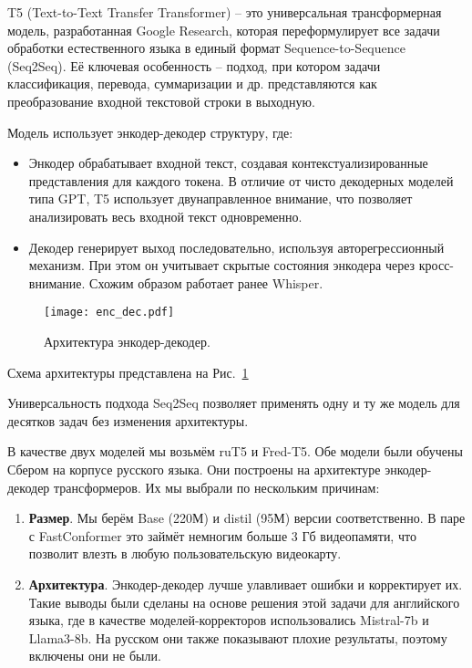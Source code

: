 T5 (Text-to-Text Transfer Transformer) -- это универсальная трансформерная модель, разработанная Google Research, которая переформулирует все задачи обработки естественного языка в единый формат Sequence-to-Sequence (Seq2Seq).
Её ключевая особенность -- подход, при котором задачи классификация, перевода, суммаризации и др. представляются как преобразование входной текстовой строки в выходную.

Модель использует энкодер-декодер структуру, где:
\begin{itemize}
  \item Энкодер обрабатывает входной текст, создавая контекстуализированные представления для каждого токена.
  В отличие от чисто декодерных моделей типа GPT, T5 использует двунаправленное внимание, что позволяет анализировать весь входной текст одновременно.
  \item Декодер генерирует выход последовательно, используя авторегрессионный механизм.
  При этом он учитывает скрытые состояния энкодера через кросс-внимание.
  Схожим образом работает ранее Whisper.
\end{itemize}

\begin{figure}[!t]
  \centering
  \texttt{[image: enc\_dec.pdf]}
  \caption{Архитектура энкодер-декодер.}
  \label{fig:enc_dec}
\end{figure}

Схема архитектуры представлена на Рис.~\ref{fig:enc_dec}

Универсальность подхода Seq2Seq позволяет применять одну и ту же модель для десятков задач без изменения архитектуры.

В качестве двух моделей мы возьмём ruT5 и Fred-T5.
Обе модели были обучены Сбером на корпусе русского языка.
Они построены на архитектуре энкодер-декодер трансформеров.
Их мы выбрали по нескольким причинам:

\begin{enumerate}
  \item \textbf{Размер}.
  Мы берём Base (220М) и distil (95М) версии соответственно. 
  В паре с FastConformer это займёт немногим больше 3 Гб видеопамяти, что позволит влезть в любую пользовательскую видеокарту.
  \item \textbf{Архитектура}.
  Энкодер-декодер лучше улавливает ошибки и корректирует их.
  Такие выводы были сделаны на основе решения этой задачи для английского языка, где в качестве моделей-корректоров использовались Mistral-7b и Llama3-8b.
  На русском они также показывают плохие результаты, поэтому включены они не были.
\end{enumerate}

